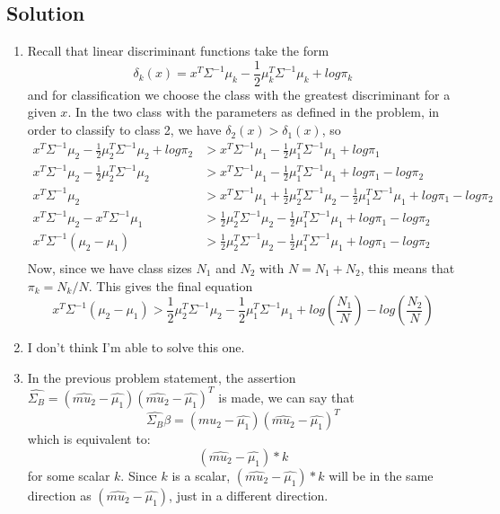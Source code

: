 \documentclass{article}
\begin{document}
\subsection{Solution}
\begin{enumerate}
  \item Recall that linear discriminant functions take the form
  $$\delta_{k}(x) = x^{T}\Sigma^{-1}\mu_{k} - \frac{1}{2}\mu_{k}^{T}\Sigma^{-1}\mu_{k} + log\pi_{k}$$
  and for classification we choose the class with the greatest discriminant for a given $x$. In the two class with the parameters as defined in the problem, in order to classify to class 2, we have $\delta_{2}(x) > \delta_{1}(x)$, so
  \begin{align*}
    x^{T}\Sigma^{-1}\mu_{2} - \frac{1}{2}\mu_{2}^{T}\Sigma^{-1}\mu_{2} + log\pi_{2} &> x^{T}\Sigma^{-1}\mu_{1} - \frac{1}{2}\mu_{1}^{T}\Sigma^{-1}\mu_{1} + log\pi_{1}\\
    x^{T}\Sigma^{-1}\mu_{2} - \frac{1}{2}\mu_{2}^{T}\Sigma^{-1}\mu_{2} &> x^{T}\Sigma^{-1}\mu_{1} - \frac{1}{2}\mu_{1}^{T}\Sigma^{-1}\mu_{1} + log\pi_{1} - log\pi_{2}\\
    x^{T}\Sigma^{-1}\mu_{2} &> x^{T}\Sigma^{-1}\mu_{1} + \frac{1}{2}\mu_{2}^{T}\Sigma^{-1}\mu_{2} - \frac{1}{2}\mu_{1}^{T}\Sigma^{-1}\mu_{1} + log\pi_{1} - log\pi_{2}\\
    x^{T}\Sigma^{-1}\mu_{2} - x^{T}\Sigma^{-1}\mu_{1} &> \frac{1}{2}\mu_{2}^{T}\Sigma^{-1}\mu_{2} - \frac{1}{2}\mu_{1}^{T}\Sigma^{-1}\mu_{1} + log\pi_{1} - log\pi_{2}\\
    x^{T}\Sigma^{-1}(\mu_{2} - \mu_{1}) &> \frac{1}{2}\mu_{2}^{T}\Sigma^{-1}\mu_{2} - \frac{1}{2}\mu_{1}^{T}\Sigma^{-1}\mu_{1} + log\pi_{1} - log\pi_{2}\\
  \end{align*}
  Now, since we have class sizes $N_{1}$ and $N_{2}$ with $N = N_{1} + N_{2}$, this means that $\pi_{k} = N_{k} / N$. This gives the final equation
  $$ x^{T}\Sigma^{-1}(\mu_{2} - \mu_{1}) > \frac{1}{2}\mu_{2}^{T}\Sigma^{-1}\mu_{2} - \frac{1}{2}\mu_{1}^{T}\Sigma^{-1}\mu_{1} + log(\frac{N_{1}}{N}) - log(\frac{N_{2}}{N}) $$

  \item I don't think I'm able to solve this one.

  \item In the previous problem statement, the assertion $ \hat{\Sigma_{B}} = (\hat{mu_{2}} - \hat{\mu_{1}})(\hat{mu_{2}} - \hat{\mu_{1}})^{T}$ is made, we can say that
  $$ \hat{\Sigma_{B}}\beta = (\hat{mu_{2}} - \hat{\mu_{1}})(\hat{mu_{2}} - \hat{\mu_{1}})^{T} $$
  which is equivalent to:
  $$ (\hat{mu_{2}} - \hat{\mu_{1}}) * k $$
  for some scalar $k$. Since $k$ is a scalar, $ (\hat{mu_{2}} - \hat{\mu_{1}}) * k $ will be in the same direction as $ (\hat{mu_{2}} - \hat{\mu_{1}}) $, just in a different direction.


\end{enumerate}
\end{document}
